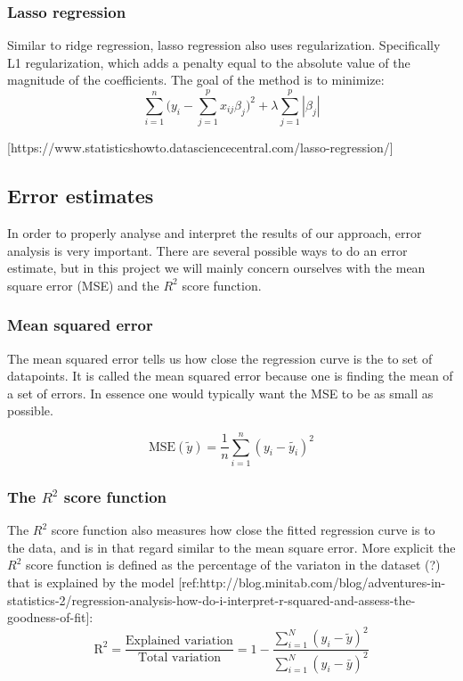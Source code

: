 \documentclass[a4paper,12pt]{article}
\begin{document}
\subsubsection{Lasso regression}
Similar to ridge regression, lasso regression also uses regularization. Specifically L1 regularization, which adds a penalty equal to the absolute value of the magnitude of the coefficients. The goal of the method is to minimize:
\begin{equation}
\sum_{i=1}^{n}\Big(y_i-\sum_{j=1}^px_{ij}\beta_j\Big)^2+\lambda\sum_{j=1}^p|\beta_j|
\end{equation}

[https://www.statisticshowto.datasciencecentral.com/lasso-regression/]

\subsection{Error estimates}
In order to properly analyse and interpret the results of our approach, error analysis is very important. There are several possible ways to do an error estimate, but in this project we will mainly concern ourselves with the mean square error (MSE) and the $R^2$ score function.\newline

\subsubsection{Mean squared error}
The mean squared error tells us how close the regression curve is the to set of datapoints. It is called the mean squared error because one is finding the mean of a set of errors. In essence one would typically want the MSE to be as small as possible.

\begin{equation}
\text{MSE}(\tilde{y})=\frac{1}{n}\sum_{i=1}^n(y_i-\tilde{y_i})^2
\end{equation}

\subsubsection{The $R^2$ score function}
The $R^2$ score function also measures how close the fitted regression curve is to the data, and is in that regard similar to the mean square error. More explicit the $R^2$ score function is defined as the percentage of the variaton in the dataset (?) that is explained by the model [ref:http://blog.minitab.com/blog/adventures-in-statistics-2/regression-analysis-how-do-i-interpret-r-squared-and-assess-the-goodness-of-fit]:
\begin{equation}
\text{R}^2=\frac{\text{Explained variation}}{\text{Total variation}} = 1-\frac{\sum_{i=1}^N(y_i-\tilde{y})^2}{\sum_{i=1}^N(y_i-\bar{y})^2}
\end{equation}
\end{document}
